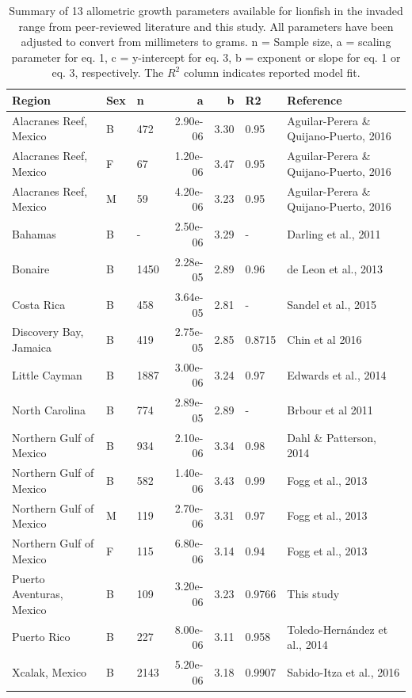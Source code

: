 \documentclass[fleqn,10pt,lineno]{wlpeerj} %
\begin{document}
\begin{table}

\caption{\label{tab:unnamed-chunk-5}\label{tab:all_params}Summary of 13 allometric growth parameters available for lionfish in the invaded range from peer-reviewed literature and this study. All parameters have been adjusted to convert from millimeters to grams. n = Sample size, a = scaling parameter for eq. 1, c = y-intercept for eq. 3, b = exponent or slope for eq. 1 or eq. 3, respectively. The $R^2$ column indicates reported model fit.}
\centering
\begin{tabular}[t]{lllrrll}
\toprule
Region & Sex & n & a & b & R2 & Reference\\
\midrule
Alacranes Reef, Mexico & B & 472 & 2.90e-06 & 3.30 & 0.95 & Aguilar-Perera \& Quijano-Puerto, 2016\\
Alacranes Reef, Mexico & F & 67 & 1.20e-06 & 3.47 & 0.95 & Aguilar-Perera \& Quijano-Puerto, 2016\\
Alacranes Reef, Mexico & M & 59 & 4.20e-06 & 3.23 & 0.95 & Aguilar-Perera \& Quijano-Puerto, 2016\\
Bahamas & B & - & 2.50e-06 & 3.29 & - & Darling et al., 2011\\
Bonaire & B & 1450 & 2.28e-05 & 2.89 & 0.96 & de Leon et al., 2013\\
\addlinespace
Costa Rica & B & 458 & 3.64e-05 & 2.81 & - & Sandel et al., 2015\\
Discovery Bay, Jamaica & B & 419 & 2.75e-05 & 2.85 & 0.8715 & Chin et al 2016\\
Little Cayman & B & 1887 & 3.00e-06 & 3.24 & 0.97 & Edwards et al., 2014\\
North Carolina & B & 774 & 2.89e-05 & 2.89 & - & Brbour et al 2011\\
Northern Gulf of Mexico & B & 934 & 2.10e-06 & 3.34 & 0.98 & Dahl \& Patterson, 2014\\
\addlinespace
Northern Gulf of Mexico & B & 582 & 1.40e-06 & 3.43 & 0.99 & Fogg et al., 2013\\
Northern Gulf of Mexico & M & 119 & 2.70e-06 & 3.31 & 0.97 & Fogg et al., 2013\\
Northern Gulf of Mexico & F & 115 & 6.80e-06 & 3.14 & 0.94 & Fogg et al., 2013\\
Puerto Aventuras, Mexico & B & 109 & 3.20e-06 & 3.23 & 0.9766 & This study\\
Puerto Rico & B & 227 & 8.00e-06 & 3.11 & 0.958 & Toledo-Hernández et al., 2014\\
Xcalak, Mexico & B & 2143 & 5.20e-06 & 3.18 & 0.9907 & Sabido-Itza et al., 2016\\
\bottomrule
\end{tabular}
\end{table}
\end{document}

